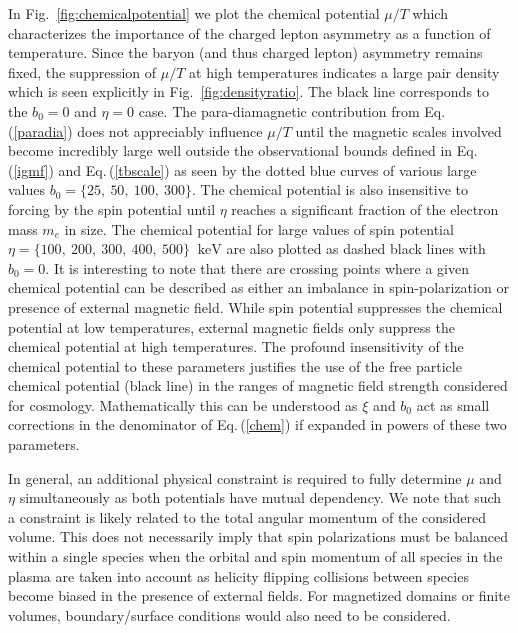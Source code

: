 \documentclass[a4paper]{article}
\newcommand*{\keV}{\text{ keV}}
\newcommand{\req}[1]{Eq.\,(\ref{#1})}
\newcommand{\rf}[1]{Fig.~{\ref{#1}}}
\begin{document}
In \rf{fig:chemicalpotential} we plot the chemical potential $\mu/T$ which characterizes the importance of the charged lepton asymmetry as a function of temperature. Since the baryon (and thus charged lepton) asymmetry remains fixed, the suppression of $\mu/T$ at high temperatures indicates a large pair density which is seen explicitly in \rf{fig:densityratio}. The black line corresponds to the $b_{0}=0$ and $\eta=0$ case. The para-diamagnetic contribution from \req{paradia} does not appreciably influence $\mu/T$ until the magnetic scales involved become incredibly large well outside the observational bounds defined in \req{igmf} and \req{tbscale} as seen by the dotted blue curves of various large values $b_{0}=\{25,\ 50,\ 100,\ 300\}$. The chemical potential is also insensitive to forcing by the spin potential until $\eta$ reaches a significant fraction of the electron mass $m_{e}$ in size. The chemical potential for large values of spin potential $\eta=\{100,\ 200,\ 300,\ 400,\ 500\}\ \keV$ are also plotted as dashed black lines with $b_{0}=0$. It is interesting to note that there are crossing points where a given chemical potential can be described as either an imbalance in spin-polarization or presence of external magnetic field. While spin potential suppresses the chemical potential at low temperatures, external magnetic fields only suppress the chemical potential at high temperatures. The profound insensitivity of the chemical potential to these parameters justifies the use of the free particle chemical potential (black line) in the ranges of magnetic field strength considered for cosmology. Mathematically this can be understood as $\xi$ and $b_{0}$ act as small corrections in the denominator of \req{chem} if expanded in powers of these two parameters.

In general, an additional physical constraint is required to fully determine $\mu$ and $\eta$ simultaneously as both potentials have mutual dependency. We note that such a constraint is likely related to the total angular momentum of the considered volume. This does not necessarily imply that spin polarizations must be balanced within a single species when the orbital and spin momentum of all species in the plasma are taken into account as helicity flipping collisions between species become biased in the presence of external fields. For magnetized domains or finite volumes, boundary/surface conditions would also need to be considered.
\end{document}
